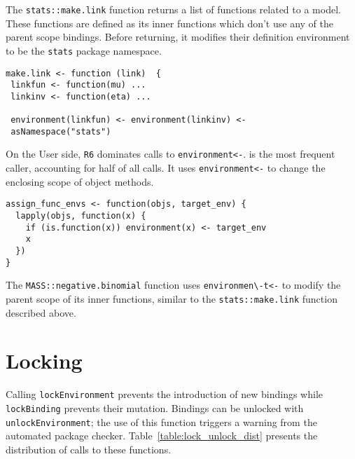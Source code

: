 \documentclass[sigplan,screen]{acmart}
\renewcommand{\c}[1]{\lstinline |#1|\xspace}
\begin{document}
The \c{stats::make.link} function returns a list of functions related to
a model. These functions are defined as its inner functions which don't use any
of the parent scope bindings. Before returning, it modifies their definition
environment to be the \c{stats} package namespace.

\begin{lstlisting}
make.link <- function (link)  {
 linkfun <- function(mu) ...
 linkinv <- function(eta) ...

 environment(linkfun) <- environment(linkinv) <-
 asNamespace("stats")
\end{lstlisting}\medskip

On the {User} side, \c{R6} dominates calls to \c{environment<-}.
\EnvAsnOneCallerName is the most frequent caller, accounting for half of all
calls. It uses \c{environment<-} to change the enclosing scope of object
methods.

\begin{lstlisting}
assign_func_envs <- function(objs, target_env) {
  lapply(objs, function(x) {
    if (is.function(x)) environment(x) <- target_env
    x
  })
}
\end{lstlisting}\medskip


The \c{MASS::negative.binomial} function uses \c{environmen\-t<-} to modify the
parent scope of its inner functions, similar to the \c{stats::make.link}
function described above.

\section{Locking}

Calling \c{lockEnvironment} prevents the introduction of new bindings while
\c{lockBinding} prevents their mutation. Bindings can be unlocked with
\c{unlockEnvironment}; the use of this function triggers a warning from the
automated package checker. Table~\ref{table:lock_unlock_dist} presents the
distribution of calls to these functions.
\end{document}
